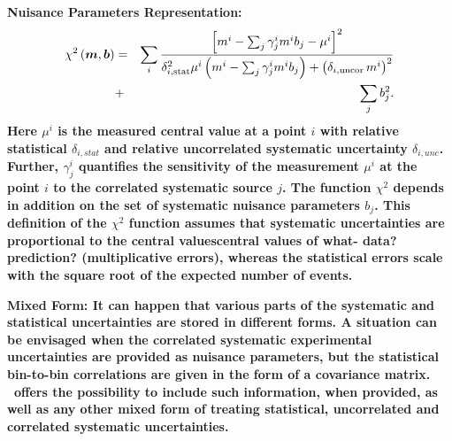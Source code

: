 \begin{description}
\item \bf{Nuisance Parameters Representation:} \rm
\begin{eqnarray} 
    \chi^2\left(\boldsymbol{m},\boldsymbol{b}\right) &= &  
 \sum_i \frac{\left[m^i - \sum_j \gamma^i_j m^i b_j  - {\mu^i} \right]^2}
{ \textstyle \delta^2_{i,{\rm stat}}\mu^i \left(m^i -  \sum_j \gamma^i_j m^i b_j\right)
  + \left(\delta_{i,{\rm uncor}}\,  m^i\right)^2} \nonumber \\
  &+& \sum_j b^2_j.
\label{eq:aven}
\end{eqnarray}
%
Here ${\mu^i}$ is the  measured central value  at a point $i$ 
with  relative statistical $\delta_{i,stat}$ 
and relative uncorrelated systematic uncertainty $\delta_{i,unc}$.
Further, 
$\gamma^i_j$ 
quantifies the sensitivity of the
measurement ${\mu^i}$ at the point $i$ to the correlated systematic 
source $j$. The function $\chi^2$ depends in addition on
 the set of systematic nuisance parameters $b_j$.
This definition of the $\chi^2$ function assumes that
systematic uncertainties are proportional to the central values{\bf central values of what- data? prediction?}   
(multiplicative errors), whereas the statistical errors scale 
with the square root of the expected number of events. 
\item  \bf{Mixed Form:} \rm
It can happen that various parts of the systematic and statistical uncertainties are stored in different forms. A situation can be envisaged when the correlated systematic experimental uncertainties are provided as nuisance parameters, but the statistical bin-to-bin correlations are given in the form of a covariance matrix. \fitter\ offers the possibility to include such information, when provided, as well as any other mixed form of treating statistical, uncorrelated and correlated systematic uncertainties. 
\end{description}


